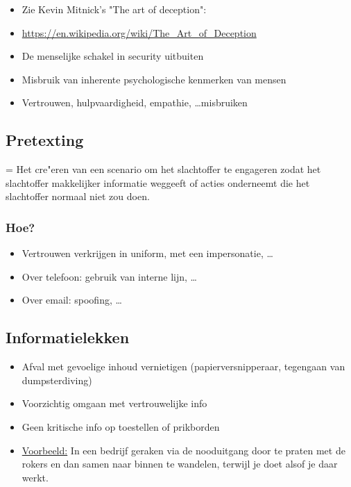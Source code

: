 \documentclass{article}
\begin{document}
\begin{itemize}
    \item Zie Kevin Mitnick's "The art of deception":
    \item \url{https://en.wikipedia.org/wiki/The\_Art\_of\_Deception}
    \item De menselijke schakel in security uitbuiten
    \item Misbruik van inherente psychologische kenmerken van mensen
    \item Vertrouwen, hulpvaardigheid, empathie, \dots misbruiken
\end{itemize}

\subsection{Pretexting}

= Het cre"eren van een scenario om het 
slachtoffer te engageren zodat het slachtoffer 
makkelijker informatie weggeeft of acties onderneemt 
die het slachtoffer normaal niet zou doen.


\subsubsection{Hoe?}

\begin{itemize}
    \item Vertrouwen verkrijgen in uniform, met een impersonatie, \dots
    \item Over telefoon: gebruik van interne lijn, \dots
    \item Over email: spoofing, \dots
\end{itemize}

\subsection{Informatielekken}

\begin{itemize}
    \item Afval met gevoelige inhoud vernietigen (papierversnipperaar, tegengaan van dumpsterdiving)
    \item Voorzichtig omgaan met vertrouwelijke info
    \item Geen kritische info op toestellen of prikborden
    \item \underline{Voorbeeld:} In een bedrijf geraken via de nooduitgang door te praten met de rokers en dan samen naar binnen te wandelen, terwijl je doet alsof je daar werkt.
\end{itemize}
\end{document}

